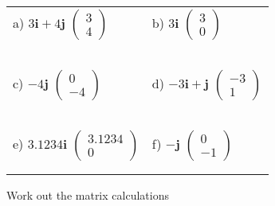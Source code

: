 \documentclass[fontsize=12pt]{scrartcl}
\begin{document}
\newline
\newline
\begin{tabular}{p{9cm}p{9cm}}
a) $3\mathbf{i}+4\mathbf{j}$
 \quad $\begin{pmatrix}3\\4 \end{pmatrix}$
&b) $3\mathbf{i}$
 \quad $\begin{pmatrix}3\\0 \end{pmatrix}$
\\\\\\
\\\\\\

c) $-4\mathbf{j}$
 \quad $\begin{pmatrix}0\\-4 \end{pmatrix}$
&d) $-3\mathbf{i}+\mathbf{j}$
 \quad $\begin{pmatrix}-3\\1 \end{pmatrix}$
\\\\\\
\\\\\\

e) $3.1234\mathbf{i}$
 \quad $\begin{pmatrix}3.1234\\0 \end{pmatrix}$
&f) $-\mathbf{j}$
 \quad $\begin{pmatrix}0\\-1 \end{pmatrix}$
\\\\\\
\end{tabular}
\newpage
Work out the matrix calculations
\newline
\newline
\end{document}
